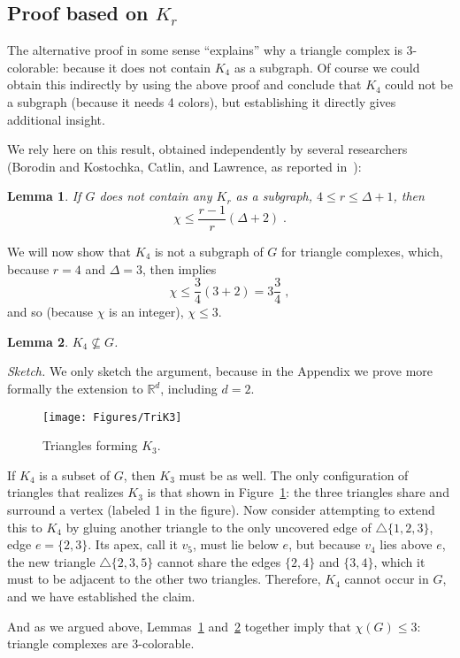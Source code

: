 \pdfoutput=1  \documentclass[]{article}
\newcommand{\ABox}{
\raisebox{3pt}{\framebox[6pt]{\rule{6pt}{0pt}}}
}
\newenvironment{proof}{{\bf Proof:}}{\hfill\ABox}
\newtheorem{lemma}{Lemma}
\newcommand{\lemlab}[1]{\label{lemma:#1}}
\newcommand{\figlab}[1]{\label{fig:#1}}
\newcommand{\lemref}[1]{\ref{lemma:#1}}
\newcommand{\figref}[1]{\ref{fig:#1}}
\def\R{{\mathbb{R}}}
\def\D{{\Delta}}
\def\c{{\chi}}
\begin{document}
\subsection{Proof based on $K_r$}
The alternative proof in some sense ``explains'' why a triangle complex
is
3-colorable: because it does not contain $K_4$ as a subgraph.
Of course we could obtain this indirectly by using the above proof and
conclude that $K_4$ could not be a subgraph (because it needs 4
colors),
but establishing it directly gives additional insight.

We rely here on this result,
obtained independently by several researchers
(Borodin and Kostochka, Catlin, and Lawrence, as reported in~\cite{s-nubcn-02}):
\begin{lemma}
If $G$ does not contain any $K_r$ as a subgraph,
$4 \le r \le \D + 1$,
then 
$$\c \le \frac{r-1}{r} (\D + 2) \;.$$
\lemlab{Lawrence}
\end{lemma}
We will now show that $K_4$ is not a subgraph of $G$ for triangle
complexes,
which, because $r=4$ and $\D=3$, then implies
$$ \c \le \frac{3}{4} (3 + 2) = 3\frac{3}{4} \;,$$
and so (because $\c$ is an integer), $\c \le 3$.

\begin{lemma}
$K_4 \not\subseteq G$.
\lemlab{notK4}
\end{lemma}
\begin{proof}
\emph{Sketch.}
We only sketch the argument, because in the Appendix we prove
more formally the extension to $\R^d$, including $d=2$.

\begin{figure}[htbp]
\centering
\texttt{[image: Figures/TriK3]}
\caption{Triangles forming $K_3$.}
\figlab{TriK3}
\end{figure}
If $K_4$ is a subset of $G$, then $K_3$ must be as well.
The only configuration of triangles that realizes $K_3$ is that shown
in Figure~\figref{TriK3}: the three triangles share and surround a vertex (labeled
1 in the figure).  Now consider attempting to
extend this to $K_4$ by gluing another triangle to the only uncovered
edge of $\triangle \{1,2,3\}$, edge $e=\{2,3\}$.  Its apex, call it
$v_5$,
must lie below $e$, but because $v_4$ lies above $e$,
the new triangle $\triangle \{2,3,5\}$ cannot share the edges
$\{2,4\}$ and $\{3,4\}$, which it must to be adjacent to the other two
triangles.  Therefore, $K_4$ cannot occur in $G$, and we have established the claim.
\end{proof}

And as we argued above, Lemmas~\lemref{Lawrence} and~\lemref{notK4}
together
imply that $\c( G ) \le 3$: triangle complexes are 3-colorable.
\end{document}
